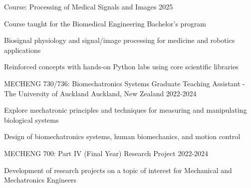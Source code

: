 \begin{cventries}
  \cventry
    {Course: Processing of Medical Signals and Images} %
    {} %
    {} %
    {2025} %
    { \begin{cvitems} %
        \item {Course taught for the Biomedical Engineering Bachelor's program}
        \item {Biosignal physiology and signal/image processing for medicine and robotics applications}
        \item {Reinforced concepts with hands-on Python labs using core scientific libraries}
      \end{cvitems}}

  \cventry
    {MECHENG 730/736: Biomechatronics Systems} %
    {Graduate Teaching Assistant - The University of Auckland} %
    {Auckland, New Zealand} %
    {2022-2024} %
    { \begin{cvitems} %
        \item {Explore mechatronic principles and techniques for measuring and manipulating biological systems}
        \item {Design of biomechatronics systems, human biomechanics, and motion control}
      \end{cvitems}}
\vspace{-5pt} 

  \cventry
    {MECHENG 700: Part IV (Final Year) Research Project} %
    {} %
    {} %
    {2022-2024} %
    { \begin{cvitems} %
        \item {Development of research projects on a topic of interest for Mechanical and Mechatronics Engineers}
      \end{cvitems}}
\end{cventries}
